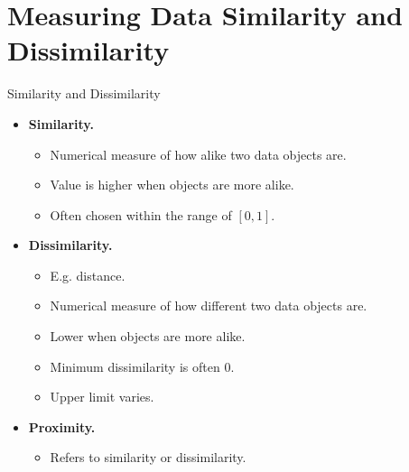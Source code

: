 \section{Measuring Data Similarity and Dissimilarity}


\begin{frame}{Similarity and Dissimilarity}
	\centering
	\begin{itemize}
		\item \textbf{Similarity.}
		      \begin{itemize}
			      \item Numerical measure of how alike two data objects are.
			      \item Value is higher when objects are more alike.
			      \item Often chosen within the range of $[0,1]$.
		      \end{itemize}
		\item \textbf{Dissimilarity.}
		      \begin{itemize}
			      \item E.g. distance.
			      \item Numerical measure of how different two data objects are.
			      \item Lower when objects are more alike.
			      \item Minimum dissimilarity is often $0$.
			      \item Upper limit varies.
		      \end{itemize}
		\item \textbf{Proximity.}
		      \begin{itemize}
			      \item Refers to similarity or dissimilarity.
		      \end{itemize}
	\end{itemize}
\end{frame}

